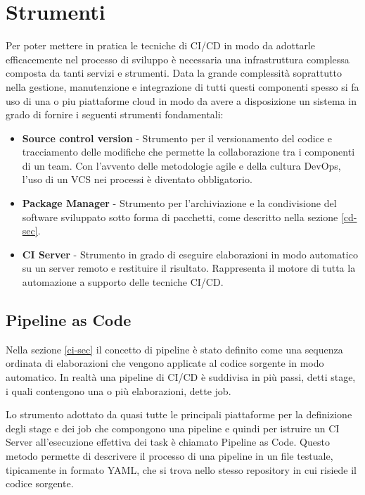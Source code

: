 \section{Strumenti}
\label{devops-tools-sec}
Per poter mettere in pratica le tecniche di CI/CD in modo da adottarle efficacemente nel processo di sviluppo è necessaria una infrastruttura complessa composta da tanti servizi e strumenti. Data la grande complessità soprattutto nella gestione, manutenzione e integrazione di tutti questi componenti spesso si fa uso di una o piu piattaforme cloud in modo da avere a disposizione un sistema in grado di fornire i seguenti strumenti fondamentali:
\begin{itemize}
    \item \textbf{Source control version} - Strumento per il versionamento del codice e tracciamento delle modifiche che permette la collaborazione tra i componenti di un team. Con l'avvento delle metodologie agile e della cultura DevOps, l'uso di un VCS nei processi è diventato obbligatorio.
    \item \textbf{Package Manager} - Strumento per l'archiviazione e la condivisione del software sviluppato sotto forma di pacchetti, come descritto nella sezione \ref{cd-sec}.
    \item \textbf{CI Server} - Strumento in grado di eseguire elaborazioni in modo automatico su un server remoto e restituire il risultato. Rappresenta il motore di tutta la automazione a supporto delle tecniche CI/CD.
\end{itemize}

\subsection{Pipeline as Code}
Nella sezione \ref{ci-sec} il concetto di pipeline è stato definito come una sequenza ordinata di elaborazioni che vengono applicate al codice sorgente in modo automatico. In realtà una pipeline di CI/CD è suddivisa in più passi, detti stage, i quali contengono una o più elaborazioni, dette job.

Lo strumento adottato da quasi tutte le principali piattaforme per la definizione degli stage e dei job che compongono una pipeline e quindi per istruire un CI Server all'esecuzione effettiva dei task è chiamato Pipeline as Code. Questo metodo permette di descrivere il processo di una pipeline in un file testuale, tipicamente in formato YAML, che si trova nello stesso repository in cui risiede il codice sorgente.

